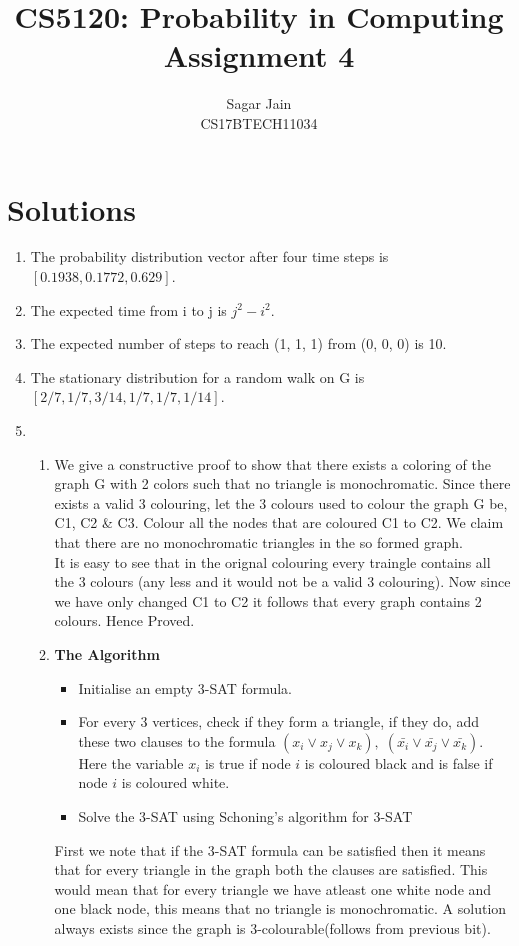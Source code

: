 \documentclass[12pt]{article}
\begin{document}
\title{CS5120: Probability in Computing\\Assignment 4}
\author{Sagar Jain\\CS17BTECH11034}
\date{}
\maketitle
\section{Solutions}
\begin{enumerate}
\item The probability distribution vector after four time steps is $[0.1938, 0.1772, 0.629 ]$.
\item The expected time from i to j is $j^2 - i^2$.
\item The expected number of steps to reach (1, 1, 1) from (0, 0, 0) is 10.
\item The stationary distribution for a random walk on G is $[2/7, 1/7, 3/14, 1/7, 1/7, 1/14]$.
\item \begin{enumerate}
\item We give a constructive proof to show that there exists a coloring of the graph G with 2 colors such that no triangle is monochromatic. Since there exists a valid 3 colouring,  let the 3 colours used to colour the graph G be, C1, C2 \& C3. Colour all the nodes that are coloured C1 to C2. We claim that there are no monochromatic triangles in the so formed graph.\\
It is easy to see that in the orignal colouring every traingle contains all the 3 colours (any less and it would not be a valid 3 colouring). Now since we have only changed C1 to C2 it follows that every graph contains 2 colours. Hence Proved.
\item \textbf{The Algorithm}
\begin{itemize}
\item Initialise an empty 3-SAT formula.
\item For every 3 vertices, check if they form a triangle, if they do, add these two clauses to the formula $(x_i \lor x_j \lor x_k), \;(\bar{x_i} \lor \bar{x_j} \lor \bar{x_k})$. Here the variable $x_i$ is true if node $i$ is coloured black and is false if node $i$ is coloured white.
\item Solve the 3-SAT using  Schoning's algorithm for 3-SAT
\end{itemize}
First we note that if the 3-SAT formula can be satisfied then it means that for every triangle in the graph both the clauses are satisfied. This would mean that for every triangle we have atleast one white node and one black node, this means that no triangle is monochromatic. A solution always exists since the graph is 3-colourable(follows from previous bit).\\

\end{enumerate}
\end{enumerate}
\end{document}
